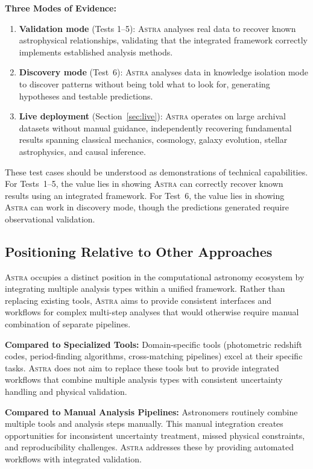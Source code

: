 \documentclass[fleqn,usenatbib]{mnras}
\newcommand{\astra}{\textsc{Astra}\xspace}
\begin{document}
\textbf{Three Modes of Evidence:}
\begin{enumerate}
  \item[(i)] \textbf{Validation mode} (Tests 1--5): \astra analyses real data to recover known astrophysical relationships, validating that the integrated framework correctly implements established analysis methods.
  \item[(ii)] \textbf{Discovery mode} (Test~6): \astra analyses data in knowledge isolation mode to discover patterns without being told what to look for, generating hypotheses and testable predictions.
  \item[(iii)] \textbf{Live deployment} (Section~\ref{sec:live}): \astra operates on large archival datasets without manual guidance, independently recovering fundamental results spanning classical mechanics, cosmology, galaxy evolution, stellar astrophysics, and causal inference.
\end{enumerate}

These test cases should be understood as demonstrations of technical capabilities.
For Tests~1--5, the value lies in showing \astra can correctly recover known results using an integrated framework.
For Test~6, the value lies in showing \astra can work in discovery mode, though the predictions generated require observational validation.

\subsection{Positioning Relative to Other Approaches}
\label{sec:discussion:positioning}

\astra occupies a distinct position in the computational astronomy ecosystem by integrating multiple analysis types within a unified framework.
Rather than replacing existing tools, \astra aims to provide consistent interfaces and workflows for complex multi-step analyses that would otherwise require manual combination of separate pipelines.

\textbf{Compared to Specialized Tools:}
Domain-specific tools (photometric redshift codes, period-finding algorithms, cross-matching pipelines) excel at their specific tasks.
\astra does not aim to replace these tools but to provide integrated workflows that combine multiple analysis types with consistent uncertainty handling and physical validation.

\textbf{Compared to Manual Analysis Pipelines:}
Astronomers routinely combine multiple tools and analysis steps manually.
This manual integration creates opportunities for inconsistent uncertainty treatment, missed physical constraints, and reproducibility challenges.
\astra addresses these by providing automated workflows with integrated validation.
\end{document}
